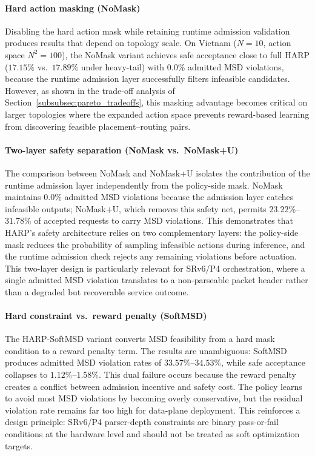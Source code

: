 \documentclass[final,5p]{elsarticle}
\begin{document}
\paragraph{Hard action masking (NoMask)}
Disabling the hard action mask while retaining runtime admission validation produces results that depend on topology scale. On Vietnam (\(N{=}10\), action space \(N^2{=}100\)), the NoMask variant achieves safe acceptance close to full HARP (\(17.15\%\) vs.\ \(17.89\%\) under heavy-tail) with \(0.0\%\) admitted MSD violations, because the runtime admission layer successfully filters infeasible candidates. However, as shown in the trade-off analysis of Section~\ref{subsubsec:pareto_tradeoffs}, this masking advantage becomes critical on larger topologies where the expanded action space prevents reward-based learning from discovering feasible placement--routing pairs.

\paragraph{Two-layer safety separation (NoMask vs.\ NoMask+U)}
The comparison between NoMask and NoMask+U isolates the contribution of the runtime admission layer independently from the policy-side mask. NoMask maintains \(0.0\%\) admitted MSD violations because the admission layer catches infeasible outputs; NoMask+U, which removes this safety net, permits \(23.22\%\)--\(31.78\%\) of accepted requests to carry MSD violations. This demonstrates that HARP's safety architecture relies on two complementary layers: the policy-side mask reduces the probability of sampling infeasible actions during inference, and the runtime admission check rejects any remaining violations before actuation. This two-layer design is particularly relevant for SRv6/P4 orchestration, where a single admitted MSD violation translates to a non-parseable packet header rather than a degraded but recoverable service outcome.

\paragraph{Hard constraint vs.\ reward penalty (SoftMSD)}
The HARP-SoftMSD variant converts MSD feasibility from a hard mask condition to a reward penalty term. The results are unambiguous: SoftMSD produces admitted MSD violation rates of \(33.57\%\)--\(34.53\%\), while safe acceptance collapses to \(1.12\%\)--\(1.58\%\). This dual failure occurs because the reward penalty creates a conflict between admission incentive and safety cost. The policy learns to avoid most MSD violations by becoming overly conservative, but the residual violation rate remains far too high for data-plane deployment. This reinforces a design principle: SRv6/P4 parser-depth constraints are binary pass-or-fail conditions at the hardware level and should not be treated as soft optimization targets.
\end{document}
